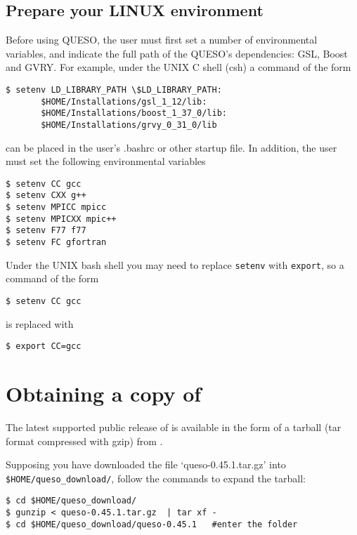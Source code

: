 \subsection{Prepare your LINUX environment}



Before using QUESO, the user must first set a number of environmental variables, and indicate the full path
of the QUESO's dependencies: GSL, Boost and GVRY. For example, under the UNIX C shell (csh) a command of the form
\begin{verbatim}
$ setenv LD_LIBRARY_PATH \$LD_LIBRARY_PATH:
       $HOME/Installations/gsl_1_12/lib:
       $HOME/Installations/boost_1_37_0/lib:
       $HOME/Installations/grvy_0_31_0/lib
\end{verbatim}
can be placed in the user's .bashrc or other startup file. In addition, the user must set the following environmental
variables
\begin{verbatim}
$ setenv CC gcc
$ setenv CXX g++
$ setenv MPICC mpicc
$ setenv MPICXX mpic++
$ setenv F77 f77
$ setenv FC gfortran
\end{verbatim}


Under the UNIX bash shell you may need to replace \texttt{setenv} with \texttt{export}, so a command of the form
\begin{verbatim}
$ setenv CC gcc
\end{verbatim}
is replaced with
\begin{verbatim}
$ export CC=gcc
\end{verbatim}

\section{Obtaining a copy of \Queso{}}

The latest supported public release of \Queso{} is available in the form of a tarball (tar format compressed with gzip) from \Quesoweb{}.

Supposing you have downloaded the file `queso-0.45.1.tar.gz' into \texttt{\$HOME/queso\_download/}, follow the commands to expand the tarball:
\begin{verbatim}
$ cd $HOME/queso_download/
$ gunzip < queso-0.45.1.tar.gz  | tar xf -
$ cd $HOME/queso_download/queso-0.45.1   #enter the folder 
\end{verbatim}

